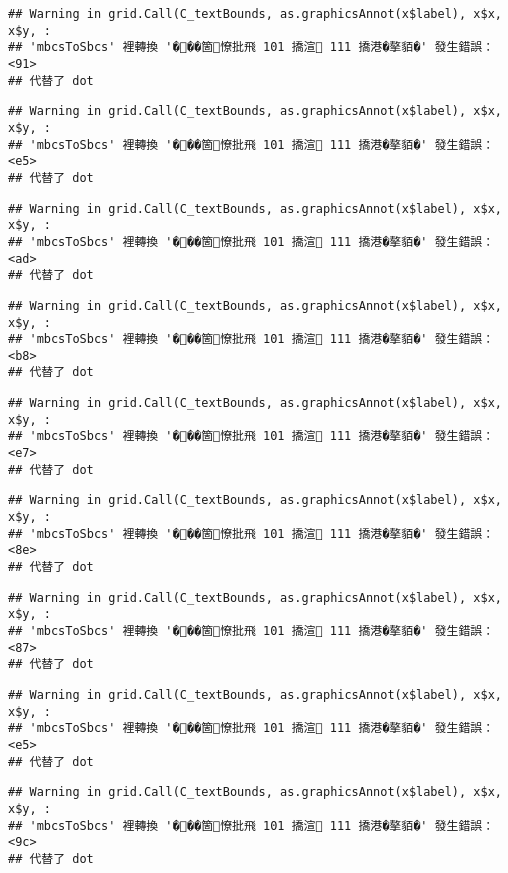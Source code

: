 \documentclass[
]{article}
\begin{document}
\begin{verbatim}
## Warning in grid.Call(C_textBounds, as.graphicsAnnot(x$label), x$x, x$y, :
## 'mbcsToSbcs' 裡轉換 '���箇憭批飛 101 撟渲 111 撟港�摮貊�' 發生錯誤：<91>
## 代替了 dot
\end{verbatim}

\begin{verbatim}
## Warning in grid.Call(C_textBounds, as.graphicsAnnot(x$label), x$x, x$y, :
## 'mbcsToSbcs' 裡轉換 '���箇憭批飛 101 撟渲 111 撟港�摮貊�' 發生錯誤：<e5>
## 代替了 dot
\end{verbatim}

\begin{verbatim}
## Warning in grid.Call(C_textBounds, as.graphicsAnnot(x$label), x$x, x$y, :
## 'mbcsToSbcs' 裡轉換 '���箇憭批飛 101 撟渲 111 撟港�摮貊�' 發生錯誤：<ad>
## 代替了 dot
\end{verbatim}

\begin{verbatim}
## Warning in grid.Call(C_textBounds, as.graphicsAnnot(x$label), x$x, x$y, :
## 'mbcsToSbcs' 裡轉換 '���箇憭批飛 101 撟渲 111 撟港�摮貊�' 發生錯誤：<b8>
## 代替了 dot
\end{verbatim}

\begin{verbatim}
## Warning in grid.Call(C_textBounds, as.graphicsAnnot(x$label), x$x, x$y, :
## 'mbcsToSbcs' 裡轉換 '���箇憭批飛 101 撟渲 111 撟港�摮貊�' 發生錯誤：<e7>
## 代替了 dot
\end{verbatim}

\begin{verbatim}
## Warning in grid.Call(C_textBounds, as.graphicsAnnot(x$label), x$x, x$y, :
## 'mbcsToSbcs' 裡轉換 '���箇憭批飛 101 撟渲 111 撟港�摮貊�' 發生錯誤：<8e>
## 代替了 dot
\end{verbatim}

\begin{verbatim}
## Warning in grid.Call(C_textBounds, as.graphicsAnnot(x$label), x$x, x$y, :
## 'mbcsToSbcs' 裡轉換 '���箇憭批飛 101 撟渲 111 撟港�摮貊�' 發生錯誤：<87>
## 代替了 dot
\end{verbatim}

\begin{verbatim}
## Warning in grid.Call(C_textBounds, as.graphicsAnnot(x$label), x$x, x$y, :
## 'mbcsToSbcs' 裡轉換 '���箇憭批飛 101 撟渲 111 撟港�摮貊�' 發生錯誤：<e5>
## 代替了 dot
\end{verbatim}

\begin{verbatim}
## Warning in grid.Call(C_textBounds, as.graphicsAnnot(x$label), x$x, x$y, :
## 'mbcsToSbcs' 裡轉換 '���箇憭批飛 101 撟渲 111 撟港�摮貊�' 發生錯誤：<9c>
## 代替了 dot
\end{verbatim}
\end{document}
